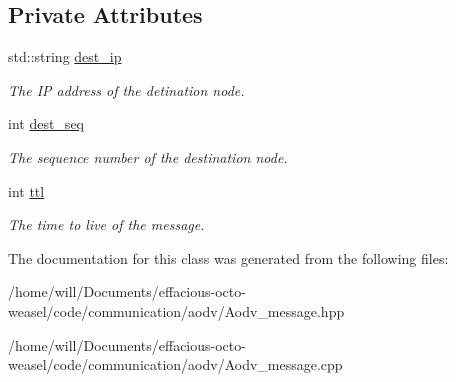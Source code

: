 \subsection*{Private Attributes}
\begin{DoxyCompactItemize}
\item 
std\+::string \hyperlink{class_aodv__message_ac4c12719a45b7666c33d67e26aaad80a}{dest\+\_\+ip}\hypertarget{class_aodv__message_ac4c12719a45b7666c33d67e26aaad80a}{}\label{class_aodv__message_ac4c12719a45b7666c33d67e26aaad80a}

\begin{DoxyCompactList}\small\item\em The IP address of the detination node. \end{DoxyCompactList}\item 
int \hyperlink{class_aodv__message_a86e0b282323ed454934908d4966c5887}{dest\+\_\+seq}\hypertarget{class_aodv__message_a86e0b282323ed454934908d4966c5887}{}\label{class_aodv__message_a86e0b282323ed454934908d4966c5887}

\begin{DoxyCompactList}\small\item\em The sequence number of the destination node. \end{DoxyCompactList}\item 
int \hyperlink{class_aodv__message_a4d7215436d8efb6bcced6ae6a2dc6f33}{ttl}\hypertarget{class_aodv__message_a4d7215436d8efb6bcced6ae6a2dc6f33}{}\label{class_aodv__message_a4d7215436d8efb6bcced6ae6a2dc6f33}

\begin{DoxyCompactList}\small\item\em The time to live of the message. \end{DoxyCompactList}\end{DoxyCompactItemize}


The documentation for this class was generated from the following files\+:\begin{DoxyCompactItemize}
\item 
/home/will/\+Documents/effacious-\/octo-\/weasel/code/communication/aodv/Aodv\+\_\+message.\+hpp\item 
/home/will/\+Documents/effacious-\/octo-\/weasel/code/communication/aodv/Aodv\+\_\+message.\+cpp\end{DoxyCompactItemize}
